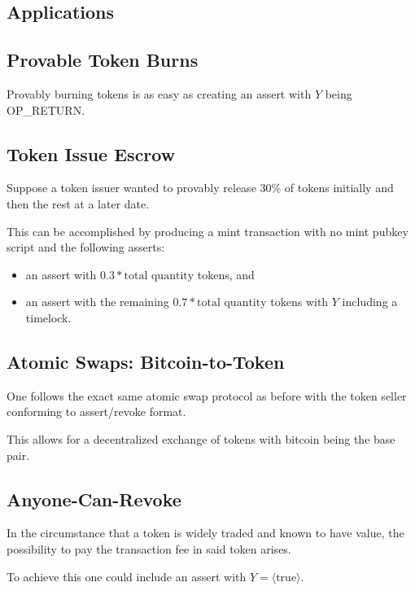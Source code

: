 \documentclass[9pt,oneside]{amsart}
\begin{document}
\begin{multicols}{2}
\section{Applications}
\subsection{Provable Token Burns}
Provably burning tokens is as easy as creating an assert with $Y$ being OP\_RETURN.
\subsection{Token Issue Escrow}
Suppose a token issuer wanted to provably release 30\% of tokens initially and then the rest at a later date.

This can be accomplished by producing a mint transaction with no mint pubkey script and the following asserts:
\begin{itemize}
    \item an assert with $0.3*\text{total quantity}$ tokens, and
    \item an assert with the remaining $0.7*\text{total quantity}$ tokens with $Y$ including a timelock.
\end{itemize}

\subsection{Atomic Swaps: Bitcoin-to-Token}
One follows the exact same atomic swap protocol as before with the token seller conforming to assert/revoke format.

This allows for a decentralized exchange of tokens with bitcoin being the base pair.

\subsection{Anyone-Can-Revoke}
In the circumstance that a token is widely traded and known to have value, the possibility to pay the transaction fee in said token arises.

To achieve this one could include an assert with $Y = \langle \text{true} \rangle$.
\end{multicols}
\end{document}
